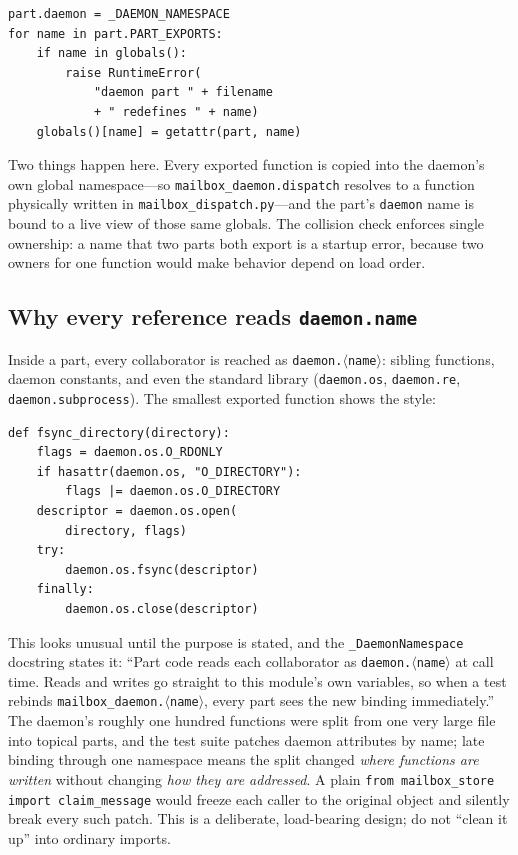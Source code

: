 \documentclass[10pt,aps,prd,twocolumn,nofootinbib]{revtex4-2}
\newcommand{\code}[1]{\texttt{#1}}
\newcommand{\file}[1]{\texttt{#1}}
\begin{document}
\begin{verbatim}
part.daemon = _DAEMON_NAMESPACE
for name in part.PART_EXPORTS:
    if name in globals():
        raise RuntimeError(
            "daemon part " + filename
            + " redefines " + name)
    globals()[name] = getattr(part, name)
\end{verbatim}

Two things happen here.  Every exported function is copied into the
daemon's own global namespace---so \code{mailbox\_daemon.dispatch}
resolves to a function physically written in
\file{mailbox\_dispatch.py}---and the part's \code{daemon} name is
bound to a live view of those same globals.  The collision check
enforces single ownership: a name that two parts both export is a
startup error, because two owners for one function would make behavior
depend on load order.

\subsection{Why every reference reads \code{daemon.name}}

Inside a part, every collaborator is reached as
\code{daemon.$\langle$name$\rangle$}: sibling functions, daemon
constants, and even the standard library
(\code{daemon.os}, \code{daemon.re}, \code{daemon.subprocess}).  The
smallest exported function shows the style:

\begin{verbatim}
def fsync_directory(directory):
    flags = daemon.os.O_RDONLY
    if hasattr(daemon.os, "O_DIRECTORY"):
        flags |= daemon.os.O_DIRECTORY
    descriptor = daemon.os.open(
        directory, flags)
    try:
        daemon.os.fsync(descriptor)
    finally:
        daemon.os.close(descriptor)
\end{verbatim}

This looks unusual until the purpose is stated, and the
\code{\_DaemonNamespace} docstring states it: ``Part code reads each
collaborator as \code{daemon.$\langle$name$\rangle$} at call time.
Reads and writes go straight to this module's own variables, so when a
test rebinds \code{mailbox\_daemon.$\langle$name$\rangle$}, every part
sees the new binding immediately.''  The daemon's roughly one hundred
functions were split from one very large file into topical parts, and
the test suite patches daemon attributes by name; late binding through
one namespace means the split changed \emph{where functions are
written} without changing \emph{how they are addressed}.  A plain
\code{from mailbox\_store import claim\_message} would freeze each
caller to the original object and silently break every such patch.
This is a deliberate, load-bearing design; do not ``clean it up'' into
ordinary imports.
\end{document}
